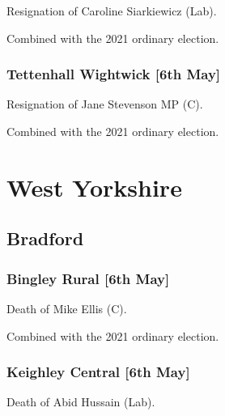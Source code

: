\documentclass[a4paper,openany]{book}
\begin{document}
\begin{resultsiii}

Resignation of Caroline Siarkiewicz (Lab).

Combined with the 2021 ordinary election.

\subsubsection*{Tettenhall Wightwick \hspace*{\fill}\nolinebreak[1]%
	\enspace\hspace*{\fill}
	[6th May]}


Resignation of Jane Stevenson MP (C).

Combined with the 2021 ordinary election.

\section{West Yorkshire}

\subsection*{Bradford}

\subsubsection*{Bingley Rural \hspace*{\fill}\nolinebreak[1]%
	\enspace\hspace*{\fill}
	[6th May]}


Death of Mike Ellis (C).

Combined with the 2021 ordinary election.

\subsubsection*{Keighley Central \hspace*{\fill}\nolinebreak[1]%
	\enspace\hspace*{\fill}
	[6th May]}


Death of Abid Hussain (Lab).


\end{resultsiii}
\end{document}
